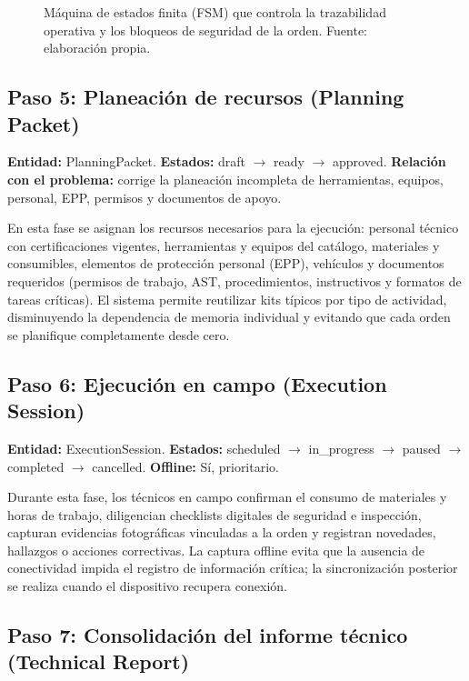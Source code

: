 \begin{figure}[!htbp]
\centering
\resizebox{0.95\textwidth}{!}{%
%
}
\caption{Máquina de estados finita (FSM) que controla la trazabilidad operativa y los bloqueos de seguridad de la orden. Fuente: elaboración propia.}
\label{fig:fsm-15-estados}
\end{figure}

\subsection{Paso 5: Planeación de recursos (Planning Packet)}

\textbf{Entidad:} PlanningPacket. \textbf{Estados:} draft $\rightarrow$ ready $\rightarrow$ approved. \textbf{Relación con el problema:} corrige la planeación incompleta de herramientas, equipos, personal, EPP, permisos y documentos de apoyo.

En esta fase se asignan los recursos necesarios para la ejecución: personal técnico con certificaciones vigentes, herramientas y equipos del catálogo, materiales y consumibles, elementos de protección personal (EPP), vehículos y documentos requeridos (permisos de trabajo, AST, procedimientos, instructivos y formatos de tareas críticas). El sistema permite reutilizar kits típicos por tipo de actividad, disminuyendo la dependencia de memoria individual y evitando que cada orden se planifique completamente desde cero.

\subsection{Paso 6: Ejecución en campo (Execution Session)}

\textbf{Entidad:} ExecutionSession. \textbf{Estados:} scheduled $\rightarrow$ in\_progress $\rightarrow$ paused $\rightarrow$ completed $\rightarrow$ cancelled. \textbf{Offline:} Sí, prioritario.

Durante esta fase, los técnicos en campo confirman el consumo de materiales y horas de trabajo, diligencian checklists digitales de seguridad e inspección, capturan evidencias fotográficas vinculadas a la orden y registran novedades, hallazgos o acciones correctivas. La captura offline evita que la ausencia de conectividad impida el registro de información crítica; la sincronización posterior se realiza cuando el dispositivo recupera conexión.

\subsection{Paso 7: Consolidación del informe técnico (Technical Report)}

